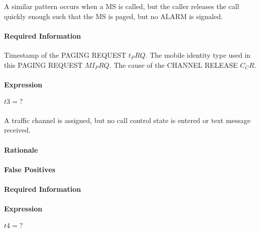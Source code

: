 \documentclass[a4paper,11pt,notitlepage,bigheadings,oneside]{scrartcl}
\begin{document}
A similar pattern occurs when a MS is called, but the caller releases the call
quickly enough such that the MS is paged, but no ALARM is signaled.

\paragraph{Required Information}

Timestamp of the PAGING REQUEST $t_PRQ$. The mobile identity type used
in this PAGING REQUEST $MI_PRQ$. The cause of the CHANNEL RELEASE
$C_CR$.

\paragraph{Expression}

$t3 = ?$

\subsubsection{}

A traffic channel is assigned, but no call control state is entered or text
message received.

\paragraph{Rationale}


\paragraph{False Positives}


\paragraph{Required Information}


\paragraph{Expression}

$t4 = ?$

\subsubsection{}
\end{document}
